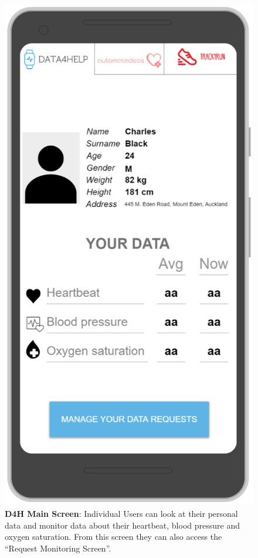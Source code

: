 \begin{figure}[H]
\centering
\includegraphics[scale = 0.5]{Mocks/Mobile_D4H_Main.PNG}
\caption{\textbf{D4H Main Screen}: Individual Users can look at their personal data and monitor data about their heartbeat, blood pressure and oxygen saturation. From this screen they can also access the “Request Monitoring Screen”. }
\end{figure}

